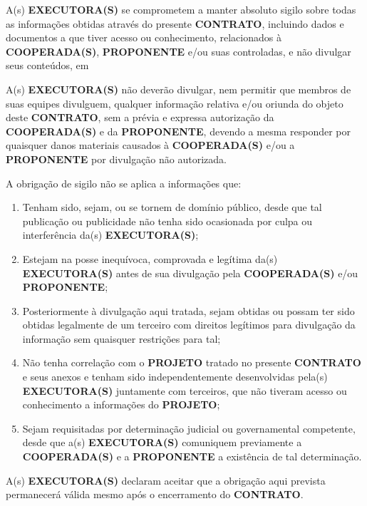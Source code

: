 

\xx A(s) \textbf{EXECUTORA(S)} se comprometem a manter absoluto sigilo sobre todas as informações obtidas através do presente \textbf{CONTRATO}, incluindo dados e documentos a que tiver acesso ou conhecimento, relacionados à \textbf{COOPERADA(S)}, \textbf{PROPONENTE} e/ou suas controladas, e não divulgar seus conteúdos, em

\xxx A(s) \textbf{EXECUTORA(S)} não deverão divulgar, nem permitir que membros de suas equipes divulguem, qualquer informação relativa e/ou oriunda do objeto deste \textbf{CONTRATO}, sem a prévia e expressa autorização da \textbf{COOPERADA(S)} e da \textbf{PROPONENTE}, devendo a mesma responder por quaisquer danos materiais causados à\textbf{ COOPERADA(S)} e/ou a \textbf{PROPONENTE} por divulgação não autorizada.

\xxx A obrigação de sigilo não se aplica a informações que:

\begin{enumerate}[label=\alph*)]
    \item Tenham sido, sejam, ou se tornem de domínio público, desde que tal publicação ou publicidade não tenha sido ocasionada por culpa ou interferência da(s) \textbf{EXECUTORA(S)};
    \item Estejam na posse inequívoca, comprovada e legítima da(s) \textbf{EXECUTORA(S)} antes de sua divulgação pela \textbf{COOPERADA(S)} e/ou \textbf{PROPONENTE};
    \item Posteriormente à divulgação aqui tratada, sejam obtidas ou possam ter sido obtidas legalmente de um terceiro com direitos legítimos para divulgação da informação sem quaisquer restrições para tal;
    \item Não tenha correlação com o \textbf{PROJETO} tratado no presente \textbf{CONTRATO} e seus anexos e tenham sido independentemente desenvolvidas pela(s) \textbf{EXECUTORA(S)} juntamente com terceiros, que não tiveram acesso ou conhecimento a informações do \textbf{PROJETO};
    \item Sejam requisitadas por determinação judicial ou governamental competente, desde que a(s) \textbf{EXECUTORA(S)} comuniquem previamente a \textbf{COOPERADA(S)} e a \textbf{PROPONENTE} a existência de tal determinação.

\end{enumerate}

\xxx A(s) \textbf{EXECUTORA(S)} declaram aceitar que a obrigação aqui prevista permanecerá válida mesmo após o encerramento do \textbf{CONTRATO}.